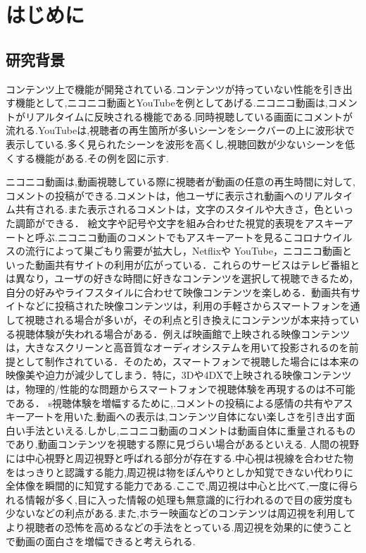 \chapter{はじめに}
\thispagestyle{myheadings}

\section{研究背景}
コンテンツ上で機能が開発されている.コンテンツが持っていない性能を引き出す機能として,ニコニコ動画とYouTubeを例としてあげる.ニコニコ動画は,コメントがリアルタイムに反映される機能である.同時視聴している画面にコメントが流れる.YouTubeは,視聴者の再生箇所が多いシーンをシークバーの上に波形状で表示している.多く見られたシーンを波形を高くし,視聴回数が少ないシーンを低くする機能がある.その例を図に示す.

ニコニコ動画は,動画視聴している際に視聴者が動画の任意の再生時間に対して,コメントの投稿ができる.コメントは，他ユーザに表示され動画へのリアルタイム共有される.また表示されるコメントは，文字のスタイルや大きさ，色といった調節ができる．
絵文字や記号や文字を組み合わせた視覚的表現をアスキーアートと呼ぶ.ニコニコ動画のコメントでもアスキーアートを見るこコロナウイルスの流行によって巣ごもり需要が拡大し，Netflixや YouTube，ニコニコ動画といった動画共有サイトの利用が広がっている．これらのサービスはテレビ番組とは異なり，ユーザの好きな時間に好きなコンテンツを選択して視聴できるため，自分の好みやライフスタイルに合わせて映像コンテンツを楽しめる．動画共有サイトなどに投稿された映像コンテンツは，利用の手軽さからスマートフォンを通して視聴される場合が多いが，その利点と引き換えにコンテンツが本来持っている視聴体験が失われる場合がある．例えば映画館で上映される映像コンテンツは，大きなスクリーンと高音質なオーディオシステムを用いて投影されるのを前提として制作されている．そのため，スマートフォンで視聴した場合には本来の映像美や迫力が減少してしまう．特に，3Dや4DXで上映される映像コンテンツは，物理的/性能的な問題からスマートフォンで視聴体験を再現するのは不可能である．
s視聴体験を増幅するために,.コメントの投稿による感情の共有やアスキーアートを用いた.動画への表示は,コンテンツ自体にない楽しさを引き出す面白い手法といえる.しかし,ニコニコ動画のコメントは動画自体に重量されるものであり,動画コンテンツを視聴する際に見づらい場合があるといえる.
人間の視野には中心視野と周辺視野と呼ばれる部分が存在する.中心視は視線を合わせた物をはっきりと認識する能力,周辺視は物をぼんやりとしか知覚できない代わりに全体像を瞬間的に知覚する能力である.ここで,周辺視は中心と比べて,一度に得られる情報が多く,目に入った情報の処理も無意識的に行われるので目の疲労度も少ないなどの利点がある.また,ホラー映画などのコンテンツは周辺視を利用してより視聴者の恐怖を高めるなどの手法をとっている.周辺視を効果的に使うことで動画の面白さを増幅できると考えられる.


